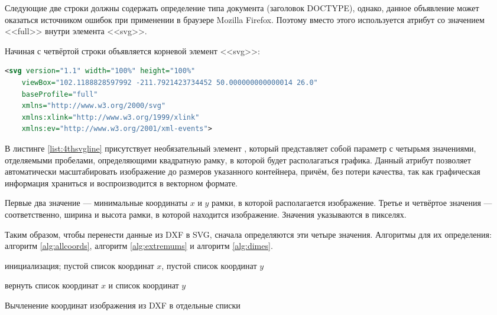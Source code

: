 Следующие две строки должны содержать определение типа документа (заголовок DOCTYPE), однако, данное объявление может оказаться источником ошибок при применении в браузере Mozilla Firefox. Поэтому вместо этого используется атрибут  со значением <<full>> внутри элемента <<svg>>.

Начиная с четвёртой строки объявляется корневой элемент <<svg>>:

\begin{lstlisting}[language=XML,caption={Первая строка SVG-файлов},label=list:4thsvgline]
	<svg version="1.1" width="100%" height="100%"
	viewBox="102.1188828597992 -211.7921423734452 50.000000000000014 26.0"
	baseProfile="full"
	xmlns="http://www.w3.org/2000/svg"
	xmlns:xlink="http://www.w3.org/1999/xlink"
	xmlns:ev="http://www.w3.org/2001/xml-events">
\end{lstlisting}

В листинге \ref{list:4thsvgline} присутствует необязательный элемент , который представляет собой параметр с четырьмя значениями, отделяемыми пробелами, определяющими квадратную рамку, в которой будет располагаться графика. Данный атрибут позволяет автоматически масштабировать изображение до размеров указанного контейнера, причём, без потери качества, так как графическая информация храниться и воспроизводится в векторном формате.

Первые два значение --- минимальные координаты $x$ и $y$ рамки, в которой располагается изображение. Третье и четвёртое значения --- соответственно, ширина и высота рамки, в которой находится изображение. Значения указываются в пикселях.

Таким образом, чтобы перенести данные из DXF в SVG, сначала определяются эти четыре значения. Алгоритмы для их определения: алгоритм \ref{alg:allcoords}, алгоритм \ref{alg:extremums} и алгоритм \ref{alg:dimes}.

\begin{algorithm}[H]
	\SetAlgoLined
	инициализация; пустой список координат $x$, пустой список координат $y$
	
	
	
	
	вернуть список координат $x$ и список координат $y$
	\caption{Вычленение координат изображения из DXF в отдельные списки}
	\label{alg:allcoords}
\end{algorithm}

